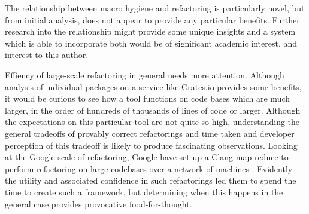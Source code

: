 The relationship between macro hygiene and refactoring is particularly novel, but from initial analysis, does not appear to provide any particular benefits. Further research into the relationship might provide some unique insights and a system which is able to incorporate both would be of significant academic interest, and interest to this author.

Effiency of large-scale refactoring in general needs more attention. Although analysis of individual packages on a service like Crates.io provides some benefits, it would be curious to see how a tool functions on code bases which are much larger, in the order of hundreds of thousands of lines of code or larger. Although the expectations on this particular tool are not quite so high, understanding the general tradeoffs of provably correct refactorings and time taken and developer perception of this tradeoff is likely to produce fascinating observations. Looking at the Google-scale of refactoring, Google have set up a Clang map-reduce to perform refactoring on large codebases over a network of machines \cite{carruth2011clang}. Evidently the utility and associated confidence in such refactorings led them to spend the time to create such a framework, but determining when this happens in the general case provides provocative food-for-thought.

